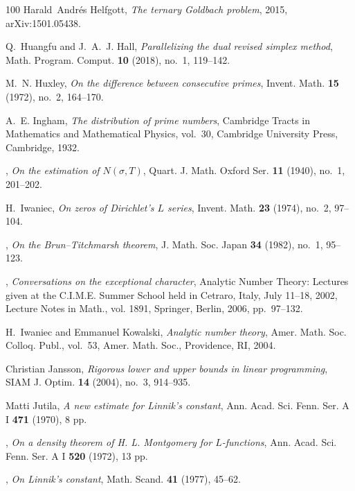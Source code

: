 \documentclass[11pt]{amsart}
\numberwithin{equation}{section}
\theoremstyle{plain}
\theoremstyle{definition}
\theoremstyle{remark}
\newcommand{\1}{\mathbf{1}}
\begin{document}
\begin{thebibliography}{100}
Harald~Andr{\'e}s Helfgott, \emph{The ternary {G}oldbach problem}, 2015,
  arXiv:1501.05438.

Q.~Huangfu and J.~A.~J. Hall, \emph{Parallelizing the dual revised simplex
  method}, Math. Program. Comput. \textbf{10} (2018), no.~1, 119--142.

M.~N. Huxley, \emph{On the difference between consecutive primes}, Invent.
  Math. \textbf{15} (1972), no.~2, 164--170.

A.~E. Ingham, \emph{The distribution of prime numbers}, Cambridge Tracts in
  Mathematics and Mathematical Physics, vol.~30, Cambridge University Press,
  Cambridge, 1932.

\bysame, \emph{On the estimation of {$N(\sigma,T)$}}, Quart. J. Math. Oxford
  Ser. \textbf{11} (1940), no.~1, 201--202.

H.~Iwaniec, \emph{On zeros of {D}irichlet's {$L$} series}, Invent. Math.
  \textbf{23} (1974), no.~2, 97--104.

\bysame, \emph{On the {B}run--{T}itchmarsh theorem}, J. Math. Soc. Japan
  \textbf{34} (1982), no.~1, 95--123.

\bysame, \emph{Conversations on the exceptional character}, Analytic Number
  Theory: Lectures given at the {C.I.M.E.} Summer School held in Cetraro,
  Italy, July 11--18, 2002, Lecture Notes in Math., vol. 1891, Springer,
  Berlin, 2006, pp.~97--132.

H.~Iwaniec and Emmanuel Kowalski, \emph{Analytic number theory}, Amer. Math.
  Soc. Colloq. Publ., vol.~53, Amer. Math. Soc., Providence, RI, 2004.

Christian Jansson, \emph{Rigorous lower and upper bounds in linear
  programming}, SIAM J. Optim. \textbf{14} (2004), no.~3, 914--935.

Matti Jutila, \emph{A new estimate for {L}innik's constant}, Ann. Acad. Sci.
  Fenn. Ser. A I \textbf{471} (1970), 8 pp. 

\bysame, \emph{On a density theorem of {H}. {L}. {M}ontgomery for
  {$L$}-functions}, Ann. Acad. Sci. Fenn. Ser. A I \textbf{520} (1972), 13 pp.

\bysame, \emph{On {L}innik's constant}, Math. Scand. \textbf{41} (1977),
  45--62.


\end{thebibliography}
\end{document}
